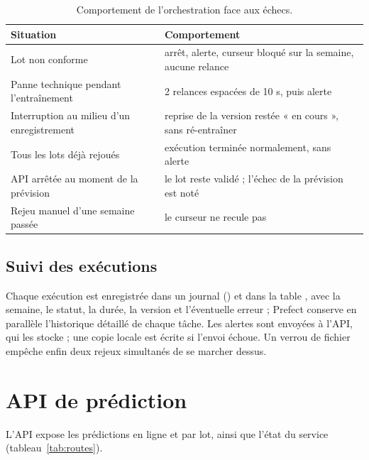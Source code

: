 \documentclass[11pt,a4paper]{article}
\newcommand{\code}[1]{\texttt{\detokenize{#1}}}
\begin{document}
\begin{table}[htbp]\centering\small
\begin{tabularx}{\linewidth}{l X}
\toprule
Situation & Comportement\\
\midrule
Lot non conforme & arrêt, alerte, curseur bloqué sur la semaine, aucune relance\\
Panne technique pendant l'entraînement & 2 relances espacées de 10 s, puis alerte\\
Interruption au milieu d'un enregistrement & reprise de la version restée « en cours », sans ré-entraîner\\
Tous les lots déjà rejoués & exécution terminée normalement, sans alerte\\
API arrêtée au moment de la prévision & le lot reste validé ; l'échec de la prévision est noté\\
Rejeu manuel d'une semaine passée & le curseur ne recule pas\\
\bottomrule
\end{tabularx}
\caption{Comportement de l'orchestration face aux échecs.}\label{tab:echecs}
\end{table}

\subsection{Suivi des exécutions}

Chaque exécution est enregistrée dans un journal (\code{runs.jsonl}) et dans la table
\code{pipeline_runs}, avec la semaine, le statut, la durée, la version et l'éventuelle
erreur ; Prefect conserve en parallèle l'historique détaillé de chaque tâche. Les alertes
sont envoyées à l'API, qui les stocke ; une copie locale est écrite si l'envoi échoue. Un
verrou de fichier empêche enfin deux rejeux simultanés de se marcher dessus.

\section{API de prédiction}\label{sec:api}

L'API expose les prédictions en ligne et par lot, ainsi que l'état du service
(tableau~\ref{tab:routes}).
\end{document}
